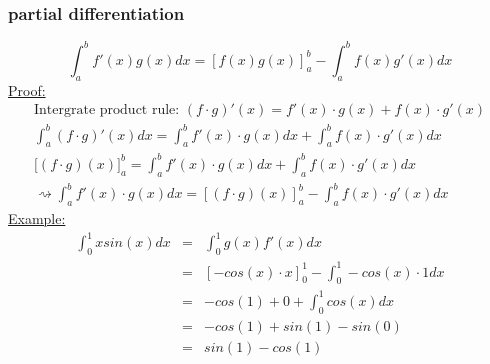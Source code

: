 \documentclass[a4paper, 12pt]{article}
\begin{document}
\subsubsection{partial differentiation} $$\int_{a}^{b} f'(x)g(x) dx = [f(x)g(x)]_{a}^{b} - \int_{a}^{b} f(x)g'(x) dx$$ \underline{Proof:}
\begin{eqnarray*}
\text{Intergrate product rule: } (f\cdot g)'(x) = f'(x) \cdot g(x) + f(x) \cdot g'(x)\\
\int^{b}_{a}(f\cdot g)'(x)dx = \int^{b}_{a}f'(x) \cdot g(x) dx + \int^{b}_{a}f(x) \cdot g'(x) dx\\
\big[ (f\cdot g)(x)\big]^{b}_{a} = \int^{b}_{a}f'(x) \cdot g(x) dx + \int^{b}_{a}f(x) \cdot g'(x) dx\\
\rightsquigarrow \int^{b}_{a}f'(x) \cdot g(x) dx = [(f\cdot g)(x)]^{b}_{a} - \int^{b}_{a}f(x) \cdot g'(x) dx
\end{eqnarray*} \underline{Example:}
\begin{eqnarray*}
\int^{1}_{0} x sin(x) dx &=& \int^{1}_{0} g(x) f'(x) dx\\
&=& [-cos(x) \cdot x]^{1}_{0} - \int^{1}_{0} -cos(x) \cdot 1 dx\\
&=& -cos(1) + 0 + \int^{1}_{0} cos(x) dx\\
&=& -cos(1) + sin(1) - sin(0)\\
&=& sin(1) - cos(1)
\end{eqnarray*}
\end{document}
